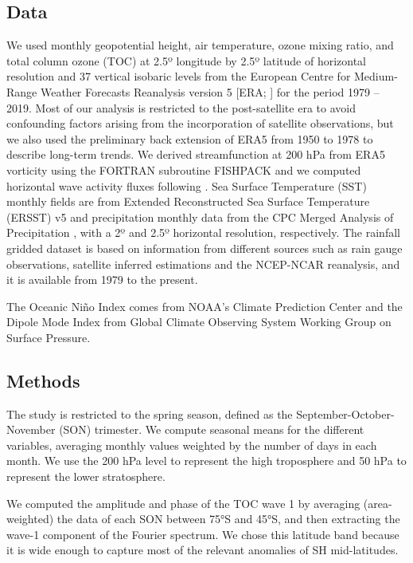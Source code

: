 \documentclass[pdflatex,sn-basic]{sn-jnl}
\theoremstyle{thmstyleone}%
\theoremstyle{thmstyletwo}%
\theoremstyle{thmstylethree}%
\begin{document}
\hypertarget{data}{%
\subsection{Data}\label{data}}

We used monthly geopotential height, air temperature, ozone mixing ratio, and total column ozone (TOC) at 2.5º longitude by 2.5º latitude of horizontal resolution and 37 vertical isobaric levels from the European Centre for Medium-Range Weather Forecasts Reanalysis version 5 {[}ERA; \citet{era5}{]} for the period 1979 -- 2019.
Most of our analysis is restricted to the post-satellite era to avoid confounding factors arising from the incorporation of satellite observations, but we also used the preliminary back extension of ERA5 from 1950 to 1978 \citep{era5be} to describe long-term trends.
We derived streamfunction at 200 hPa from ERA5 vorticity using the FORTRAN subroutine FISHPACK \citep{fishpack} and we computed horizontal wave activity fluxes following \citet{plumb1985}.
Sea Surface Temperature (SST) monthly fields are from Extended Reconstructed Sea Surface Temperature (ERSST) v5 \citep{huang2017} and precipitation monthly data from the CPC Merged Analysis of Precipitation \citep{cmap}, with a 2º and 2.5º horizontal resolution, respectively.
The rainfall gridded dataset is based on information from different sources such as rain gauge observations, satellite inferred estimations and the NCEP-NCAR reanalysis, and it is available from 1979 to the present.

The Oceanic Niño Index \citep[ONI,][]{bamston1997} comes from NOAA's Climate Prediction Center and the Dipole Mode Index \citep[DMI,][]{saji2003} from Global Climate Observing System Working Group on Surface Pressure.

\hypertarget{methods-1}{%
\subsection{Methods}\label{methods-1}}

The study is restricted to the spring season, defined as the September-October-November (SON) trimester.
We compute seasonal means for the different variables, averaging monthly values weighted by the number of days in each month.
We use the 200 hPa level to represent the high troposphere and 50 hPa to represent the lower stratosphere.

We computed the amplitude and phase of the TOC wave 1 by averaging (area-weighted) the data of each SON between 75°S and 45°S, and then extracting the wave-1 component of the Fourier spectrum.
We chose this latitude band because it is wide enough to capture most of the relevant anomalies of SH mid-latitudes.
\end{document}
